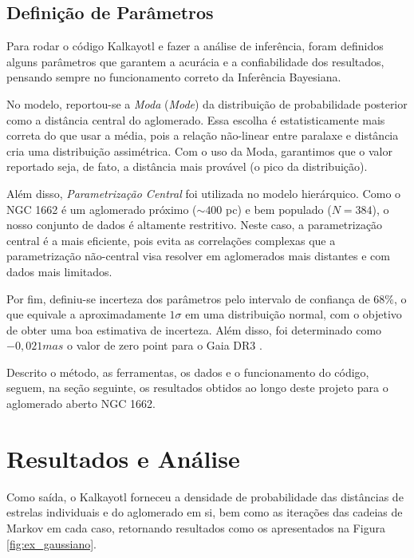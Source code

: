 \documentclass[12pt]{projeto}
\begin{document}
\subsection{Definição de Parâmetros}

Para rodar o código Kalkayotl e fazer a análise de inferência, foram definidos alguns parâmetros que garantem a acurácia e a confiabilidade dos resultados, pensando sempre no funcionamento correto da Inferência Bayesiana.

No modelo, reportou-se a \textit{Moda} (\textit{Mode}) da distribuição de probabilidade posterior como a distância central do aglomerado. Essa escolha é estatisticamente mais correta do que usar a média, pois a relação não-linear entre paralaxe e distância cria uma distribuição assimétrica. Com o uso da Moda, garantimos que o valor reportado seja, de fato, a distância mais provável (o  pico da distribuição).

Além disso, \textit{Parametrização Central} foi utilizada no modelo hierárquico. Como o NGC 1662 é um aglomerado próximo ($\sim 400$ pc) e bem populado ($N=384$), o nosso conjunto de dados é altamente restritivo. Neste caso, a parametrização central é a mais eficiente, pois evita as correlações complexas que a parametrização não-central visa resolver em aglomerados mais distantes e com dados mais limitados.

Por fim, definiu-se incerteza dos parâmetros pelo intervalo de confiança de $68\%$, o que equivale a aproximadamente $1\sigma$ em uma distribuição normal, com o objetivo de obter uma boa estimativa de incerteza. Além disso, foi determinado como \(-0,021mas\) o valor de zero point para o Gaia DR3  \cite{groenewegen_parallax_2021}.

Descrito o método, as ferramentas, os dados e o funcionamento do código, seguem, na seção seguinte, os resultados obtidos ao longo deste projeto para o aglomerado aberto NGC 1662.

\section{Resultados e Análise}

Como saída, o Kalkayotl forneceu a densidade de probabilidade das distâncias de estrelas individuais e do aglomerado em si, bem como as iterações das cadeias de Markov em cada caso, retornando resultados como os apresentados na Figura \ref{fig:ex_gaussiano}.
\end{document}
